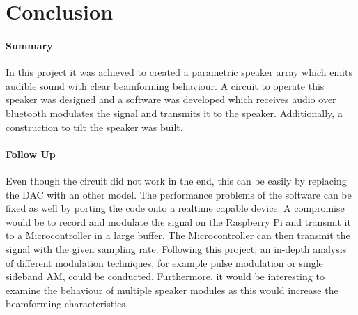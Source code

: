 \chapter{Conclusion}


\subsubsection*{Summary}

In this project it was achieved to created a parametric speaker array which emits audible sound with clear beamforming behaviour. A circuit to operate this speaker was designed and a software was developed which receives audio over bluetooth modulates the signal and transmits it to the speaker. Additionally, a construction to tilt the speaker was built.
%
\subsubsection*{Follow Up}
%
Even though the circuit did not work in the end, this can be easily by replacing the DAC with an other model. The performance problems of the software can be fixed as well by porting the code onto a realtime capable device. A compromise would be to record and modulate the signal on the Raspberry Pi and transmit it to a Microcontroller in a large buffer. The Microcontroller can then transmit the signal with the given sampling rate.\p
%
Following this project, an in-depth analysis of different modulation techniques, for example pulse modulation or single sideband AM, could be conducted. Furthermore, it would be interesting to examine the behaviour of multiple speaker modules as this would increase the beamforming characteristics.